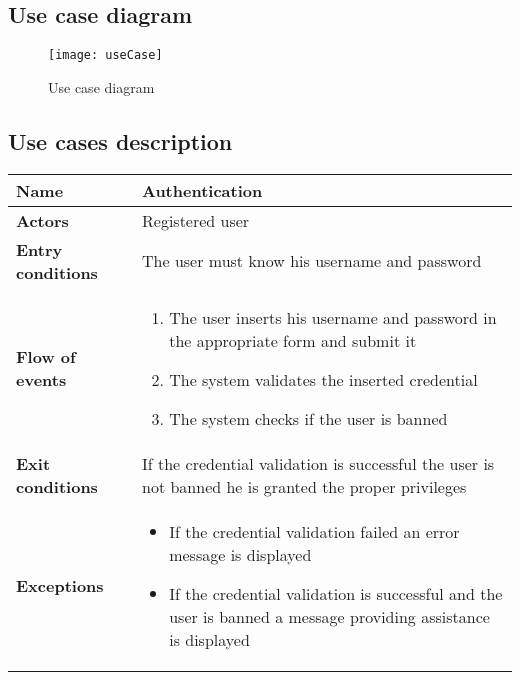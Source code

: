 \newpage\subsection{Use case diagram}
\begin{figure}[h]
			\centering
			\texttt{[image: useCase]}
			\caption{
				\label{fig:useCase} 
				Use case diagram
			}
		\end{figure}
\subsection{Use cases description}
\begin{tabular}{p{0.25\linewidth}p{0.75\linewidth}}
\toprule
\textbf{Name} & \textbf{Authentication} \\
\midrule
\textbf{Actors} &  Registered user \\
\midrule
\textbf{Entry conditions} & The user must know his username and password \\
\midrule
\textbf{Flow of events} & 
\begin{enumerate}
	\item The user inserts his username and password in the appropriate form and submit it
	\item The system validates the inserted credential
	\item The system checks if the user is banned
\end{enumerate} \\
\midrule
\textbf{Exit conditions} & If the credential validation is successful the user is not banned he is granted the proper privileges\\
\midrule
\textbf{Exceptions} & 
\begin{itemize}
	\item If the credential validation failed an error message is displayed
	\item If the credential validation is successful and the user is banned a message providing assistance is displayed
\end{itemize} \\
\bottomrule
\end{tabular}

